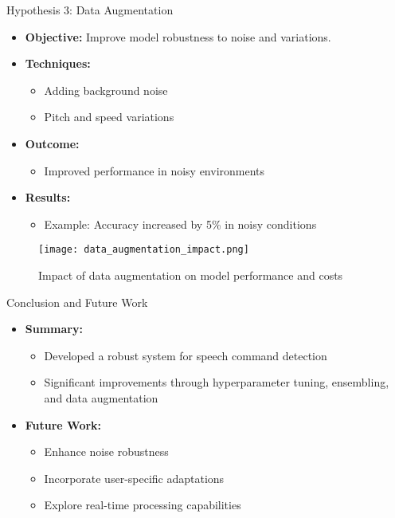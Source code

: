 \documentclass{beamer}
\begin{document}
\begin{frame}{Hypothesis 3: Data Augmentation}
  \begin{itemize}
    \item \textbf{Objective:} Improve model robustness to noise and variations.
    \item \textbf{Techniques:}
      \begin{itemize}
        \item Adding background noise
        \item Pitch and speed variations
      \end{itemize}
    \item \textbf{Outcome:}
      \begin{itemize}
        \item Improved performance in noisy environments
      \end{itemize}
    \item \textbf{Results:}
      \begin{itemize}
        \item Example: Accuracy increased by 5\% in noisy conditions
      \end{itemize}
  \end{itemize}
    \begin{figure}
    \texttt{[image: data\_augmentation\_impact.png]}
    \caption{Impact of data augmentation on model performance and costs}
  \end{figure}
\end{frame}

\begin{frame}{Conclusion and Future Work}
  \begin{itemize}
    \item \textbf{Summary:}
      \begin{itemize}
        \item Developed a robust system for speech command detection
        \item Significant improvements through hyperparameter tuning, ensembling, and data augmentation
      \end{itemize}
    \item \textbf{Future Work:}
      \begin{itemize}
        \item Enhance noise robustness
        \item Incorporate user-specific adaptations
        \item Explore real-time processing capabilities
      \end{itemize}
  \end{itemize}
\end{frame}
\end{document}
